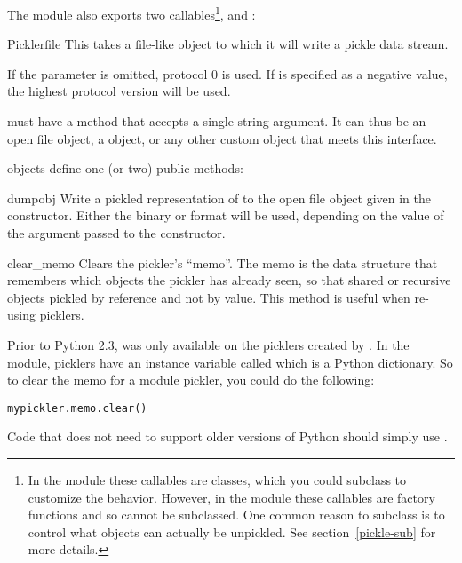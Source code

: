 The  module also exports two callables\footnote{In the
 module these callables are classes, which you could
subclass to customize the behavior.  However, in the 
module these callables are factory functions and so cannot be
subclassed.  One common reason to subclass is to control what
objects can actually be unpickled.  See section~\ref{pickle-sub} for
more details.},  and :

\begin{classdesc}{Pickler}{file}
This takes a file-like object to which it will write a pickle data
stream.  

If the  parameter is omitted, protocol 0 is used.
If  is specified as a negative value,
the highest protocol version will be used.


 must have a  method that accepts a single
string argument.  It can thus be an open file object, a
 object, or any other custom
object that meets this interface.
\end{classdesc}

 objects define one (or two) public methods:

\begin{methoddesc}[Pickler]{dump}{obj}
Write a pickled representation of  to the open file object
given in the constructor.  Either the binary or \ASCII{} format will
be used, depending on the value of the  argument passed to the
constructor.
\end{methoddesc}

\begin{methoddesc}[Pickler]{clear_memo}{}
Clears the pickler's ``memo''.  The memo is the data structure that
remembers which objects the pickler has already seen, so that shared
or recursive objects pickled by reference and not by value.  This
method is useful when re-using picklers.

\begin{notice}
Prior to Python 2.3,  was only available on the
picklers created by .  In the  module,
picklers have an instance variable called  which is a
Python dictionary.  So to clear the memo for a  module
pickler, you could do the following:

\begin{verbatim}
mypickler.memo.clear()
\end{verbatim}

Code that does not need to support older versions of Python should
simply use .
\end{notice}
\end{methoddesc}

